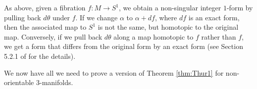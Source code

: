 As above, given a fibration $f: M \to S^1$, we obtain a non-singular integer $1$-form by
pulling back $d\theta$ under $f$. %
If we change $\alpha$ to $\alpha + df$, where $df$ is an exact form, then the associated map to $S^1$ is not the same, but homotopic to the original map. Conversely, if we pull back $d\theta$ along a map homotopic to $f$ rather than $f$, we get a form that differs from the original form by an exact form (see Section 5.2.1 of \cite{calegari2007foliations} for the details). %

We now have all we need to prove a version of Theorem \ref{thm:Thur1} for non-orientable
$3$-manifolds.

